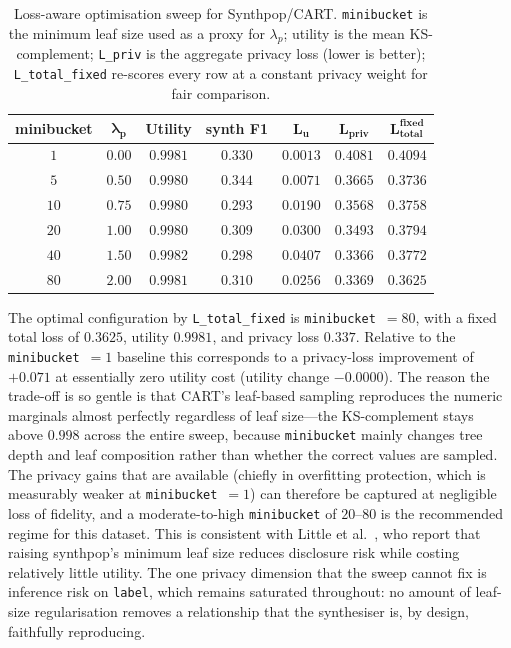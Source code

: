 \documentclass[11pt]{article}
\begin{document}
\begin{table}[ht]
\centering
\caption{Loss-aware optimisation sweep for Synthpop/CART. \texttt{minibucket} is the minimum leaf size used as a proxy for $\lambda_p$; utility is the mean KS-complement; \texttt{L\_priv} is the aggregate privacy loss (lower is better); \texttt{L\_total\_fixed} re-scores every row at a constant privacy weight for fair comparison.}
\label{tab:sweep}
\begin{tabular}{ccccccc}
\hline
\textbf{minibucket} & $\boldsymbol{\lambda_p}$ & \textbf{Utility} & \textbf{synth F1} & $\mathbf{L_{u}}$ & $\mathbf{L_{priv}}$ & $\mathbf{L_{total}^{fixed}}$ \\
\hline
$1$  & $0.00$ & $0.9981$ & $0.330$ & $0.0013$ & $0.4081$ & $0.4094$ \\
$5$  & $0.50$ & $0.9980$ & $0.344$ & $0.0071$ & $0.3665$ & $0.3736$ \\
$10$ & $0.75$ & $0.9980$ & $0.293$ & $0.0190$ & $0.3568$ & $0.3758$ \\
$20$ & $1.00$ & $0.9980$ & $0.309$ & $0.0300$ & $0.3493$ & $0.3794$ \\
$40$ & $1.50$ & $0.9982$ & $0.298$ & $0.0407$ & $0.3366$ & $0.3772$ \\
$80$ & $2.00$ & $0.9981$ & $0.310$ & $0.0256$ & $0.3369$ & $\mathbf{0.3625}$ \\
\hline
\end{tabular}
\end{table}

The optimal configuration by \texttt{L\_total\_fixed} is \texttt{minibucket}~$=80$, with a fixed total loss of $0.3625$, utility $0.9981$, and privacy loss $0.337$. Relative to the \texttt{minibucket}~$=1$ baseline this corresponds to a privacy-loss improvement of $+0.071$ at essentially zero utility cost (utility change $-0.0000$). The reason the trade-off is so gentle is that CART's leaf-based sampling reproduces the numeric marginals almost perfectly regardless of leaf size---the KS-complement stays above $0.998$ across the entire sweep, because \texttt{minibucket} mainly changes tree depth and leaf composition rather than whether the correct values are sampled. The privacy gains that are available (chiefly in overfitting protection, which is measurably weaker at \texttt{minibucket}~$=1$) can therefore be captured at negligible loss of fidelity, and a moderate-to-high \texttt{minibucket} of $20$--$80$ is the recommended regime for this dataset. This is consistent with Little et al.~\cite{little2025synthetic}, who report that raising synthpop's minimum leaf size reduces disclosure risk while costing relatively little utility. The one privacy dimension that the sweep cannot fix is inference risk on \texttt{label}, which remains saturated throughout: no amount of leaf-size regularisation removes a relationship that the synthesiser is, by design, faithfully reproducing.
\end{document}

